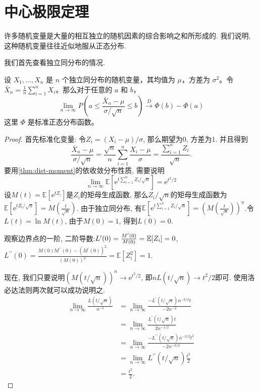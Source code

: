 \section{中心极限定理}

许多随机变量是大量的相互独立的随机因素的综合影响之和所形成的. 我们说明, 这种随机变量往往近似地服从正态分布.

我们首先查看独立同分布的情况. 

\begin{theorem}[中心极限定理]
    \label{thm:clt-iid}
    设 $X_1, \ldots, X_n$ 是 $n$ 个独立同分布的随机变量，其均值为 $\mu$，方差为 $\sigma^2$。令 $\bar{X}_n=\frac{1}{n} \sum_{i=1}^n X_i$。那么对于任意的 $a$ 和 $b$，
    $$
    \lim _{n \rightarrow \infty} P\left(a \leq \frac{\bar{X}_n-\mu}{\sigma / \sqrt{n}} \leq b\right) \stackrel{D}{\longrightarrow} \Phi(b)-\Phi(a)
    $$
    这里 $\Phi$ 是标准正态分布函数。
        \end{theorem}

    \begin{proof}
        首先标准化变量: 令$Z_i=\left(X_i-\mu\right) / \sigma$, 那么期望为0, 方差为1. 并且得到$$
            \frac{\bar{X}_n-\mu}{\sigma / \sqrt{n}}=\frac{\sqrt{n}}{n} \sum_{i=1}^n \frac{X_i-\mu}{\sigma}=\frac{\sum_{i=1}^n Z_i}{\sqrt{n}} .
            $$
            要用\cref{thm:dist-moment}的依收敛分布性质, 需要说明$$
            \lim _{n \rightarrow \infty} \mathbb{E}\left[\mathrm{e}^{t \sum_{i=1}^n Z_i / \sqrt{n}}\right]=\mathrm{e}^{t^2 / 2}
            $$
            设$M(t)=\mathbb{E}\left[\mathrm{e}^{t Z_i}\right]$是$Z_i$的矩母生成函数, 那么$Z_i / \sqrt{n}$的矩母生成函数为$\mathbb{E}\left[\mathrm{e}^{t Z_i / \sqrt{n}}\right]=M\left(\frac{t}{\sqrt{n}}\right)$. 由于独立同分布, 有$\mathbb{E}\left[\mathrm{e}^{t \sum_{i=1}^n Z_i / \sqrt{n}}\right]=\left(M\left(\frac{t}{\sqrt{n}}\right)\right)^n$.令$L(t)=\ln M(t)$, 由于$M(0)=1$, 得到$L(0)=0$.

            观察边界点的一阶, 二阶导数:$L^{\prime}(0)=\frac{M^{\prime}(0)}{M(0)}=\mathbb E[Z_i]=0$, $L^{\prime \prime}(0)=\frac{M(0) M^{\prime \prime}(0)-\left(M^{\prime}(0)\right)^2}{(M(0))^2}=\mathbb{E}\left[Z_i^2\right]=1$.

            现在, 我们只要说明$(M(t / \sqrt{n}))^n \rightarrow \mathrm{e}^{t^2 / 2}$, 即$n L(t / \sqrt{n}) \rightarrow t^2 / 2$即可. 
            使用洛必达法则两次就可以成功说明之.
        $$\begin{aligned} \lim _{n \rightarrow \infty} \frac{L(t / \sqrt{n})}{n^{-1}} & =\lim _{n \rightarrow \infty} \frac{-L^{\prime}(t / \sqrt{n}) n^{-3 / 2} t}{-2 n^{-2}} \\ & =\lim _{n \rightarrow \infty} \frac{L^{\prime}(t / \sqrt{n}) t}{2 n^{-1 / 2}} \\ & =\lim _{n \rightarrow \infty} \frac{-L^{\prime \prime}(t / \sqrt{n}) n^{-3 / 2} t^2}{-2 n^{-3 / 2}} \\ & =\lim _{n \rightarrow \infty} L^{\prime \prime}(t / \sqrt{n}) \frac{t^2}{2} \\ & =\frac{t^2}{2} .\end{aligned}$$

    \end{proof}

